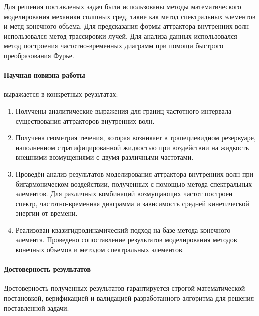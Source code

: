 \documentclass[utf8x]{G7-32} %
\begin{document}
Для решения поставленых задач были использованы методы математического моделирования механики сплшных сред, такие как метод спектральных элементов и метд конечного объема. Для предсказания формы аттрактора внутренних волн использовался метод трассировки лучей. Для анализа данных использовался метод построения частотно-временных диаграмм при помощи быстрого преобразования Фурье.

\paragraph{Научная новизна работы} выражается в конкретных реузьтатах:
\begin{enumerate}[1.]
  \item Получены аналитические выражения для границ частотного интервала существования аттракторов внутренних волн.%
    
  \item Получена геометрия течения, которая возникает в трапециевидном резервуаре, наполненном стратифицированной жидкостью при воздействии на жидкость внешними возмущениями с двумя различными частотами. 
    
  \item Проведён анализ результатов моделирования аттрактора внутренних волн при бигармоническом воздействии, полученных с помощью метода спектральных элементов. Для различных комбинаций возмущающих частот построен спектр, частотно-временная диаграмма и зависимость средней кинетической энергии от времени. 
    
  \item Реализован квазигидродинамический подход на базе метода конечного элемента. Проведено сопоставление результатов моделирования методов конечных объемов и методом спектральных элементов.
\end{enumerate}

\paragraph{Достоверность результатов}

Достоверность полученных результатов гарантируется строгой математической постановкой, верификацией и валидацией разработанного алгоритма для решения поставленной задачи.

\end{document}
